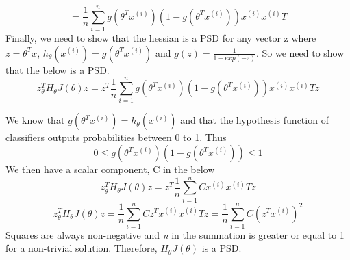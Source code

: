 \begin{answer}
\begin{equation}
\end{equation}
\begin{equation}
    = \frac{1}{n} \sum_{i=1}^{n} 
    g(\theta^T x^{(i)})(1-g(\theta^T x^{(i)})) x^{(i)} x^{(i)}T
\end{equation}
Finally, we need to show that the hessian is a PSD for any vector z where $z= \theta^Tx$,  $h_\theta (x^{(i)}) = g(\theta^T x^{(i)})$ and $g(z) = \frac{1}{1+exp(-z)}$. So we need to show that the below is a PSD.
\begin{equation}
    z_\theta^T H_\theta J(\theta)z= z^T \frac{1}{n} \sum_{i=1}^{n} 
    g(\theta^T x^{(i)})(1-g(\theta^T x^{(i)})) x^{(i)} x^{(i)}T z
\end{equation}

We know that $g(\theta^T x^{(i)}) = h_\theta (x^{(i)})$ and that the hypothesis function of classifiers outputs probabilities between 0 to 1. Thus
\begin{equation}
    0 \leq g(\theta^T x^{(i)})(1-g(\theta^T x^{(i)})) \leq   1
\end{equation}
We then have a scalar component, C in the below
\begin{equation}
    z_\theta^T H_\theta J(\theta)z= z^T \frac{1}{n} \sum_{i=1}^{n} 
    C x^{(i)} x^{(i)}T z
\end{equation}
\begin{equation}
    z_\theta^T H_\theta J(\theta)z = \frac{1}{n} \sum_{i=1}^{n} 
    C  z^T x^{(i)} x^{(i)}T z  = \frac{1}{n} \sum_{i=1}^{n} 
    C  (z^T x^{(i)})^2 
\end{equation}
Squares are always non-negative and \textit{n} in the summation is greater or equal to 1 for a non-trivial solution. Therefore, $H_\theta J(\theta)$ is a PSD.


\end{answer}
